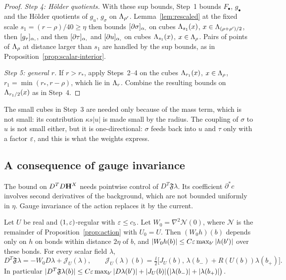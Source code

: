 \begin{proof}
\emph{Step 4: H\"older quotients.} With these sup bounds, Step~1 bounds $F_\bullet$, $g_\bullet$ and the H\"older quotients of $g_u$, $g_\sigma$ on $\Lambda_{\rho'}$. Lemma~\ref{lem:rescaled} at the fixed scale $s_1=(r-\rho)/40\ge\eta$ then bounds $[\partial\sigma]_{\alpha,}$ on cubes $\Lambda_{s_1}(x)$, $x\in\Lambda_{(\rho+\rho')/2}$, then $[g_\tau]_{\alpha,}$, and then $[\partial\tau]_{\alpha,}$ and $[\partial u]_{\alpha,}$ on cubes $\Lambda_{s_1}(x)$, $x\in\Lambda_\rho$. Pairs of points of $\Lambda_\rho$ at distance larger than $s_1$ are handled by the sup bounds, as in Proposition~\ref{prop:scalar-interior}.

\emph{Step 5: general $r$.} If $r>r_*$, apply Steps~2--4 on the cubes $\Lambda_{r_1}(x)$, $x\in\Lambda_\rho$, $r_1=\min(r_*,r-\rho)$, which lie in $\Lambda_r$. Combine the resulting bounds on $\Lambda_{r_1/2}(x)$ as in Step~4.
\end{proof}

The small cubes in Step~3 are needed only because of the mass term, which is not small: its contribution $\kappa s|u|$ is made small by the radius. The coupling of $\sigma$ to $u$ is not small either, but it is one-directional: $\sigma$ feeds back into $u$ and $\tau$ only with a factor $\varepsilon$, and this is what the weights express.

\subsection{A consequence of gauge invariance}

The bound on $D^TD\mathbf H^X$ needs pointwise control of $D^T\mathfrak F\lambda$. Its coefficient $\partial^*c$ involves second derivatives of the background, which are not bounded uniformly in $\eta$. Gauge invariance of the action replaces it by the current.

\begin{lemma}\label{lem:div-curvature}
Let $U$ be real and $(1,\varepsilon)$-regular with $\varepsilon\le c_5$. Let $W_0=\nabla^2\mathcal N(0)$, where $\mathcal N$ is the remainder of Proposition~\ref{prop:action} with $U_0=U$. Then $(W_0h)(b)$ depends only on $h$ on bonds within distance $2\eta$ of $b$, and $|W_0h(b)|\le C\varepsilon\max_{b'}|h(b')|$ over these bonds. For every scalar field $\lambda$,
\[
D^T\mathfrak F\lambda=-W_0D\lambda+\mathcal J_U(\lambda),\qquad\mathcal J_U(\lambda)(b)=\tfrac\ii2\big[J_U(b),\,\lambda(b_-)+R(U(b))\lambda(b_+)\big].
\]
In particular $|D^T\mathfrak F\lambda(b)|\le C\varepsilon\max_{b'}|D\lambda(b')|+|J_U(b)|\big(|\lambda(b_-)|+|\lambda(b_+)|\big)$.
\end{lemma}

